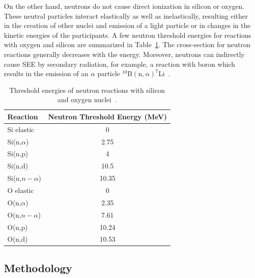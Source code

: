 On the other hand, neutrons do not cause direct ionization in silicon or oxygen. These neutral particles interact elastically as well as inelastically, resulting either in the creation of other nuclei and emission of a light particle or in changes in the kinetic energies of the participants. A few neutron threshold energies for reactions with oxygen and silicon are summarized in Table~\ref{cross-seciton}. The cross-section for neutron reactions generally decreases with the energy. Moreover, neutrons can indirectly cause \gls{SEE} by secondary radiation, for example, a reaction with boron which results in the emission of an $\alpha$ particle $\mathrm{^{10}B(n,\alpha)^{7}Li}$~\cite{1545891,neutrons_energy,neutrons_energy_2}. 

\begin{table}[!h]
\centering
\caption{Threshold energies of neutron reactions with silicon and oxygen nuclei~\cite{ENDF}.}
\begin{tabular}{lc}
\hline
Reaction         & Neutron Threshold Energy (MeV) \\ \hline
Si elastic       & 0                              \\
Si(n,$\alpha$)   & 2.75                           \\
Si(n,p)          & 4                              \\
Si(n,d)          & 10.5                           \\
Si(n,$n-\alpha$) & 10.35                          \\ \hline
O elastic        & 0                              \\
O(n,$\alpha$)    & 2.35                           \\
O(n,$n-\alpha$)  & 7.61                           \\
O(n,p)           & 10.24                          \\
O(n,d)           & 10.53                         
\end{tabular}

\label{cross-seciton}
\end{table}


\subsection{Methodology}

